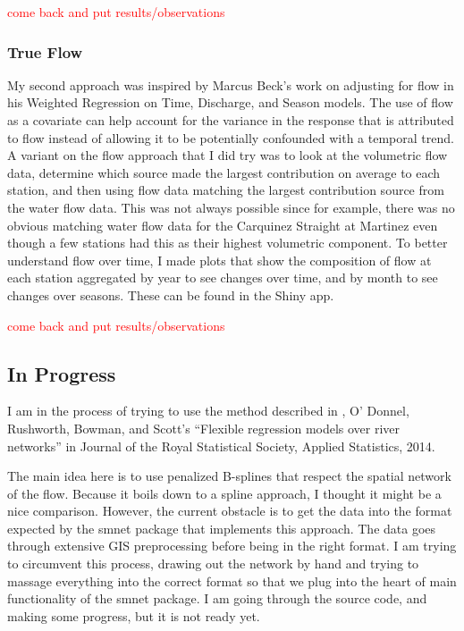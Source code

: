 \documentclass[12pt]{amsart}
\begin{document}
\textcolor{red}{come back and put results/observations}


\subsubsection{True Flow}

My second approach was inspired by Marcus Beck's work on adjusting for flow in his Weighted Regression on Time, Discharge, and Season models. The use of flow as a covariate can help account for the variance in the response that is attributed to flow instead of allowing it to be potentially confounded with a temporal trend. \textcolor{To make this approach more spatial, I should go back and fit a spatial model with flow as a covariate allowing as many of the temporal components to vary by station as possible. Then at least the flows from each station can be leveraged.} A variant on the flow approach that I did try was to look at the volumetric flow data, determine which source made the largest contribution on average to each station, and then using flow data matching the largest contribution source from the water flow data. This was not always possible since for example, there was no obvious matching water flow data for the Carquinez Straight at Martinez even though a few stations had this as their highest volumetric component. To better understand flow over time, I  made plots that show the composition of flow at each station aggregated by year to see changes over time, and by month to see changes over seasons. These can be found in the Shiny app.

\textcolor{red}{come back and put results/observations}

\subsection{In Progress}

I am in the process of trying to use the method described in , O' Donnel, Rushworth, Bowman, and Scott's ``Flexible regression models over river networks'' in Journal of the Royal Statistical Society, Applied Statistics, 2014.

The main idea here is to use penalized B-splines that respect the spatial network of the flow. Because it boils down to a spline approach, I thought it might be a nice comparison. However, the current obstacle is to get the data into the format expected by the smnet package that implements this approach. The data goes through extensive GIS preprocessing before being in the right format. I am trying to circumvent this process, drawing out the network by hand and trying to massage everything into the correct format so that we plug into the heart of main functionality of the smnet package. I am going through the source code, and making some progress, but it is not ready yet.
\end{document}
